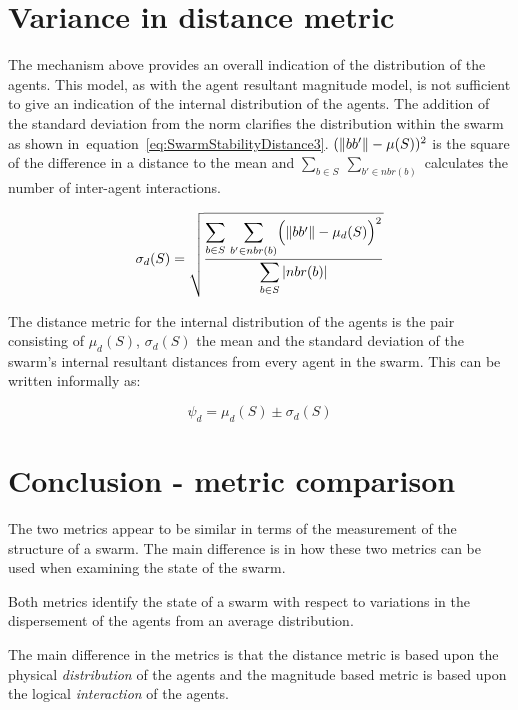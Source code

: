 \section{Variance in distance metric}\label{Section:VarianceInDistance}
The mechanism above provides an overall indication of the distribution of the agents. This model, as with the agent resultant magnitude model, is not sufficient to give an indication of the internal distribution of the agents. The addition of the standard deviation from the norm clarifies the distribution within the swarm as shown in~equation~\ref{eq:SwarmStabilityDistance3}. $(\Vert{bb'}\Vert - \mu(S))^2$ is the square of the difference in a distance to the mean and $\sum_{b \in S}~\sum_{b' \in nbr(b)}$ calculates the number of inter-agent interactions.

\begin{equation}
\label{eq:SwarmStabilityDistance3}
\sigma_d(S) = \sqrt{\frac{\mathlarger{\sum_{b \in S}}~\mathlarger{\sum_{b' \in nbr(b)}}\Big(\magn{bb'} - \mu_d(S)\Big)^2}{\mathlarger{\sum_{b \in S}\card{nbr(b)}}}}
\end{equation}

The distance metric for the internal distribution of the agents is the pair consisting of $\mu_d(S)$, $\sigma_d(S)$ the mean and the standard deviation of the swarm's internal resultant distances from every agent in the swarm. This can be written informally as:

\begin{equation}
\label{eq:SwarmPotentialMagnitude2}
\psi_d = \mu_d(S)\pm \sigma_d(S)
\end{equation}

\section{Conclusion - metric comparison\label{metric:MagnitudeDistanceComparison}}
The two metrics appear to be similar in terms of the measurement of the structure of a swarm. The main difference is in how these two metrics can be used when examining the state of the swarm.

Both metrics identify the state of a swarm with respect to variations in the dispersement of the agents from an average distribution. 

The main difference in the metrics is that the distance metric is based upon the physical \textit{distribution} of the agents and the magnitude based metric is based upon the logical \textit{interaction} of the agents.


